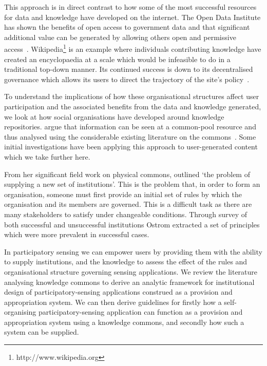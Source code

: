This approach is in direct contrast to how some of the most successful resources for data and knowledge have developed on the internet. 
The Open Data Institute has shown the benefits of open access to government data and that significant additional value can be generated by allowing others open and permissive access~\citep{Shadbolt2012}. 
Wikipedia\footnote{http://www.wikipedia.org} is an example where individuals contributing knowledge have created an encyclopaedia at a scale which would be infeasible to do in a traditional top-down manner. 
Its continued success is down to its decentralised governance which allows its users to direct the trajectory of the site's policy~\citep{Famiglietti2011}.

To understand the implications of how these organisational structures affect user participation and the associated benefits from the data and knowledge generated, we look at how social organisations have developed around knowledge repositories.
 argue that information can be seen at a common-pool resource and thus analysed using the considerable existing literature on the commons~\citep{Hess2007}. 
Some initial investigations have been applying this approach to user-generated content~\citep{Pitt2012} which we take further here.

From her significant field work on physical commons, \citet[p.42]{Ostrom1990} outlined `the problem of supplying a new set of institutions'. 
This is the problem that, in order to form an organisation, someone must first provide an initial set of rules by which the organisation and its members are governed.
This is a difficult task as there are many stakeholders to satisfy under changeable conditions. Through survey of both successful and unsuccessful institutions Ostrom extracted a set of principles which were more prevalent in successful cases.

In participatory sensing we can empower users by providing them with the ability to supply institutions, and the knowledge to assess the effect of the rules and organisational structure governing sensing applications. 
We review the literature analysing knowledge commons to derive an analytic framework for institutional design of participatory-sensing applications construed as a provision and appropriation system.  %
We can then derive guidelines for firstly how a self-organising participatory-sensing application can function as a provision and appropriation system using a knowledge commons, and secondly how such a system can be supplied.


